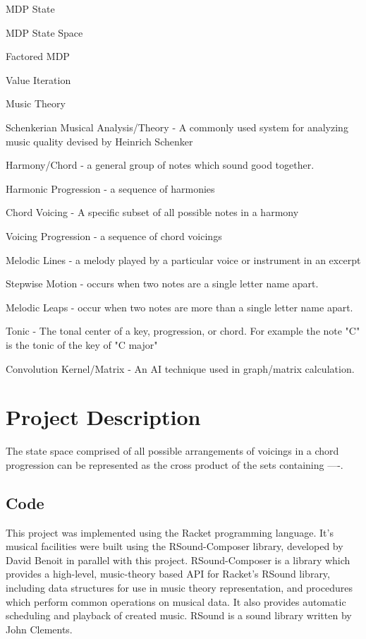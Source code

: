 \documentclass{chi2009}
\begin{document}
MDP State

MDP State Space

Factored MDP

Value Iteration

Music Theory

Schenkerian Musical Analysis/Theory - A commonly used system for analyzing music quality devised by Heinrich Schenker

Harmony/Chord - a general group of notes which sound good together.  

Harmonic Progression - a sequence of harmonies

Chord Voicing - A specific subset of all possible notes in a harmony

Voicing Progression - a sequence of chord voicings

Melodic Lines - a melody played by a particular voice or instrument in an excerpt

Stepwise Motion - occurs when two notes are a single letter name apart.

Melodic Leaps - occur when two notes are more than a single letter name apart.

Tonic - The tonal center of a key, progression, or chord.  For example the note "C" is the tonic of the key of "C major"

Convolution Kernel/Matrix - An AI technique used in graph/matrix calculation.

\section{Project Description}
The state space comprised of all possible arrangements of voicings in a chord progression can be represented as the cross product of the sets containing ----.


\subsection{Code}
This project was implemented using the Racket programming language.  It's musical facilities were built using the RSound-Composer library, developed by David Benoit in parallel with this project.  RSound-Composer is a library which provides a high-level, music-theory based API for Racket's RSound library, including data structures for use in music theory representation, and procedures which perform common operations on musical data.  It also provides automatic scheduling and playback of created music.  RSound is a sound library written by John Clements.
\end{document}

